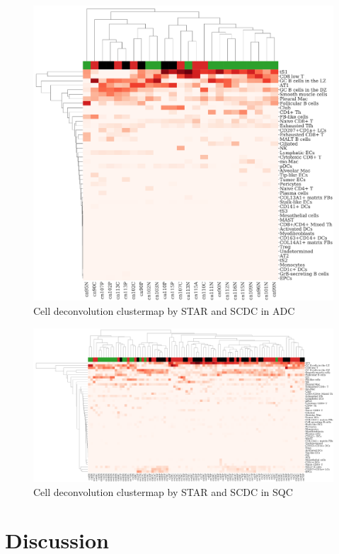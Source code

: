 \documentclass[a4paper]{article}
\begin{document}
                \begin{figure}[htbp]
                    \centering
                    \includegraphics[width=0.6 \linewidth]{figures/SCDC/clustermap/STAR.ADC.cluster.pdf}
                    \caption{Cell deconvolution clustermap by STAR and SCDC in ADC}
                    \label{fig:Deconvolution-SCDC-STAR-cluster-ADC}
                \end{figure}

                \begin{figure}[htbp]
                    \centering
                    \includegraphics[width=\linewidth]{figures/SCDC/clustermap/STAR.SQC.cluster.pdf}
                    \caption{Cell deconvolution clustermap by STAR and SCDC in SQC}
                    \label{fig:Deconvolution-SCDC-STAR-cluster-SQC}
                \end{figure}

    \section{Discussion}

    
    
\end{document}
